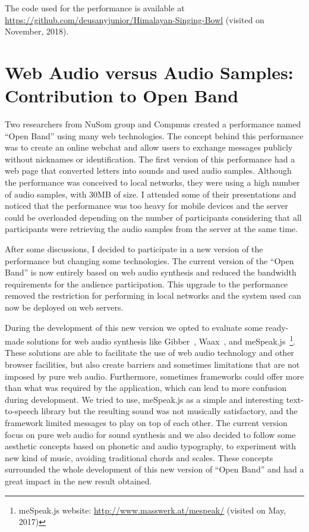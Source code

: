The code used for the performance is available at\\ \url{https://github.com/deusanyjunior/Himalayan-Singing-Bowl} (visited on November, 2018).


\section{Web Audio versus Audio Samples: Contribution to Open Band}
\label{apesec:appbandaaberta}

Two researchers from NuSom group and Compmus created a performance named ``Open Band'' using many web technologies.
The concept behind this performance was to create an online webchat and allow users to exchange messages publicly without nicknames or identification.
The first version of this performance had a web page that converted letters into sounds and used audio samples.
Although the performance was conceived to local networks, they were using a high number of audio samples, with 30MB of size.
I attended some of their presentations and noticed that the performance was too heavy for mobile devices and the server could be overloaded depending on the number of participants considering that all participants were retrieving the audio samples from the server at the same time.

After some discussions, I decided to participate in a new version of the performance but changing some technologies.
The current version of the ``Open Band'' is now entirely based on web audio synthesis and reduced the bandwidth requirements for the audience participation.
This upgrade to the performance removed the restriction for performing in local networks and the system used can now be deployed on web servers.

During the development of this new version we opted to evaluate some ready-made solutions for web audio synthesis like Gibber~\citep{Roberts2012gibberlivecoding}, Waax~\citep{Choi2013waax}, and meSpeak.js~\footnote{meSpeak.js website: \url{http://www.masswerk.at/mespeak/} (visited on May, 2017)}.
These solutions are able to facilitate the use of web audio technology and other browser facilities, but also create barriers and sometimes limitations that are not imposed by pure web audio.
Furthermore, sometimes frameworks could offer more than what was required by the application, which can lead to more confusion during development. 
We tried to use, meSpeak.js as a simple and interesting text-to-speech library but the resulting sound was not musically satisfactory, and the framework limited messages to play on top of each other.
The current version focus on pure web audio for sound synthesis and we also decided to follow some aesthetic concepts based on phonetic and audio typography, to experiment with new kind of music, avoiding traditional chords and scales. 
These concepts surrounded the whole development of this new version of ``Open Band'' and had a great impact in the new result obtained.


